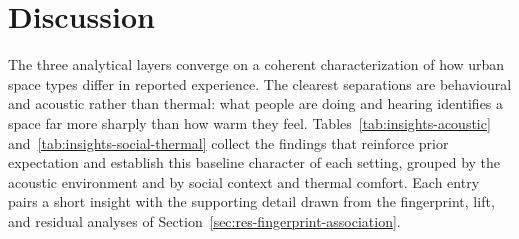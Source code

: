 \documentclass[]{interact}
\begin{document}






\section{Discussion}\label{sec:discussion}

The three analytical layers converge on a coherent characterization of how urban space types differ in reported experience.
The clearest separations are behavioural and acoustic rather than thermal: what people are doing and hearing identifies a space far more sharply than how warm they feel.
Tables~\ref{tab:insights-acoustic} and~\ref{tab:insights-social-thermal} collect the findings that reinforce prior expectation and establish this baseline character of each setting, grouped by the acoustic environment and by social context and thermal comfort.
Each entry pairs a short insight with the supporting detail drawn from the fingerprint, lift, and residual analyses of Section~\ref{sec:res-fingerprint-association}.
\end{document}
